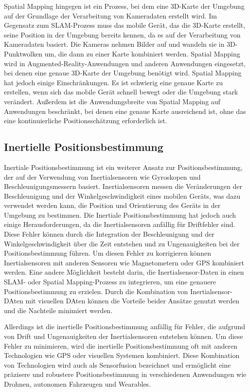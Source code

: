     Spatial Mapping hingegen ist ein Prozess, bei dem eine 3D-Karte der Umgebung auf der Grundlage der Verarbeitung von Kameradaten erstellt wird. Im Gegensatz zum SLAM-Prozess muss das mobile Gerät, das die 3D-Karte erstellt, seine Position in der Umgebung bereits kennen, da es auf der Verarbeitung von Kameradaten basiert. Die Kameras nehmen Bilder auf und wandeln sie in 3D-Punktwolken um, die dann zu einer Karte kombiniert werden. Spatial Mapping wird in Augmented-Reality-Anwendungen und anderen Anwendungen eingesetzt, bei denen eine genaue 3D-Karte der Umgebung benötigt wird.
    Spatial Mapping hat jedoch einige Einschränkungen.
    Es ist schwierig eine genaue Karte zu erstellen, wenn sich das mobile Gerät schnell bewegt oder die Umgebung stark verändert. Außerdem ist die Anwendungsbreite von Spatial Mapping auf Anwendungen beschränkt, bei denen eine genaue Karte ausreichend ist, ohne das eine kontinuierliche Positionsschätzung erforderlich ist.
   
    \subsection{Inertielle Positionsbestimmung} \label{inertielle_positionsbestimmung:subsection}
    Inertiale Positionsbestimmung ist ein weiterer Ansatz zur Positionsbestimmung, der auf der Verwendung von Inertialsensoren wie Gyroskopen und Beschleunigungsmessern basiert. Inertialsensoren messen die Veränderungen der Beschleunigung und der Winkelgeschwindigkeit eines mobilen Geräts, was dazu verwendet werden kann, die Position und Orientierung des Geräts in der Umgebung zu bestimmen. Die Inertiale Positionsbestimmung hat jedoch auch einige Herausforderungen, da die Inertialsensoren anfällig für Driftfehler sind. Diese Fehler können durch die Integration der Beschleunigung und der Winkelgeschwindigkeit über die Zeit entstehen und zu Ungenauigkeiten bei der Positionsbestimmung führen. Um diesen Fehler zu korrigieren können Inertialsensoren mit anderen Sensoren wie Magnetometern oder GPS kombiniert werden.
    Eine andere Möglichkeit besteht darin, die Inertialsensor-Daten in einen SLAM- oder Spatial Mapping-Prozess zu integrieren, um eine genauere Positionsbestimmung zu erzielen. Durch die Kombination von Inertialsensor-DAten mit visuellen DAten können die Vorteile beider Ansätze genutzt werden und die Nachteile minimiert werden.


Allerdings ist die inertielle Positionsbestimmung anfällig für Fehler, die aufgrund von Drift und Ungenauigkeiten der Inertialsensoren entstehen können. Um diese Fehler zu minimieren, wird die inertielle Positionsbestimmung oft mit anderen Technologien wie GPS oder visuellen Systemen kombiniert. Diese Kombination von Technologien wird auch als Sensorfusion bezeichnet und ermöglicht eine präzisere und robustere Positionsbestimmung in verschiedenen Anwendungen wie Drohnen, autonomen Fahrzeugen und Wearables.

